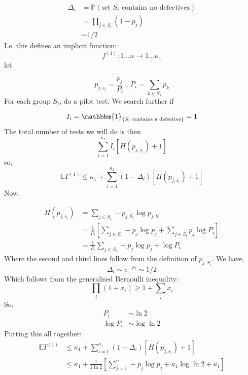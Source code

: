 \documentclass[11pt]{article}
\newcommand{\Prob}[1]
{\mathbb{P}\left( #1 \right)}
\theoremstyle{plain}
\begin{document}
\begin{align}
\Delta_i &= \Prob{\text{set \(S_i\) contains no defectives}}\\
 &= \prod_{j\in S_i}\left(1-p_j\right) \\
 &\sim 1/2
\end{align}
I.e. this defines an implicit function:
\begin{equation}
f^{\left(1\right)}: 1\ldots n \rightarrow 1\ldots \kappa_1
\end{equation}
let

\begin{equation}
p_{j,s_i} = \frac{p_j}{P_i} \text{ , } P_i = \sum_{k\in S_k}p_k
\end{equation}
For each group \(S_i\), do a pilot test. We search further if

\begin{equation}
I_i = \mathbbm{1}_{\text{\{\(S_i\) contains a defective\}}} = 1
\end{equation}
The total number of tests we will do is then
\begin{equation}
\sum_{i=1}^{\kappa_1} I_i\left[H\left(p_{j,s_i}\right)+1\right]
\end{equation}
so,
\begin{equation}
\mathbb{E}T^{\left(1\right)} \leq \kappa_1 + \sum_{i=1}^{\kappa_1} \left(1-\Delta_i\right)\left[H\left(p_{j,s_i}\right)+1\right]
\end{equation}
Now,

\begin{align}
H\left(p_{j,s_i}\right) &= \sum_{j\in S_i} -p_{j,S_i}\log{p_
{j,S_i}} \\
&= \frac{1}{P_i}\left[\sum_{j\in S_i} -p_{j}\log{p_j} + \sum_{j\in S_i} p_{j}\log{P_i}\right] \\
&= \frac{1}{P_i}\sum_{j\in S_i} -p_{j}\log{p_j} + \log{P_i}
\end{align}
Where the second and third lines follow from the definition of \(p_{j,S_i}\).
We have,
\begin{equation}
\Delta_i \sim e^{-P_i} \sim 1/2
\end{equation}
Which follows from the generalised Bernoulli inequality:	
\begin{equation}
\prod_i \left(1+x_i\right) \geq 1+\sum_i x_i
\end{equation}
So,
\begin{align}
P_i &\sim \ln{2} \\
\log{P_i} &\sim \log{\ln{2}}
\label{probnorm}
\end{align}
Putting this all together:
\begin{align}
\mathbb{E}T^{\left(1\right)} &\leq \kappa_1 + \sum_{i=1}^{\kappa_1} \left(1-\Delta_i\right)\left[H\left(p_{j,s_i}\right)+1\right] \\
&\leq \kappa_1 + \frac{1}{2\ln{2}}\left[\sum_{j=1}^n-p_j\log{p_j} + \kappa_1\log{\ln{2}} +\kappa_1\right]
\end{align}
\end{document}
